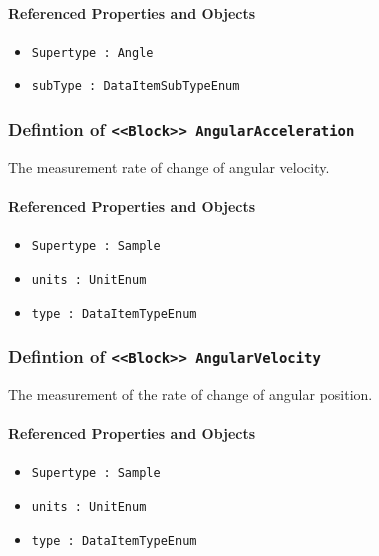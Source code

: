 \FloatBarrier
\paragraph{Referenced Properties and Objects}

\begin{itemize}
\item \texttt{Supertype : Angle}

\item \texttt{subType : DataItemSubTypeEnum}

\end{itemize}
\FloatBarrier
\subsubsection{Defintion of \texttt{<<Block>> AngularAcceleration}}
  \label{type:AngularAcceleration}

\FloatBarrier

The measurement rate of change of angular velocity.

\FloatBarrier
\paragraph{Referenced Properties and Objects}

\begin{itemize}
\item \texttt{Supertype : Sample}

\item \texttt{units : UnitEnum}

\item \texttt{type : DataItemTypeEnum}

\end{itemize}
\FloatBarrier
\subsubsection{Defintion of \texttt{<<Block>> AngularVelocity}}
  \label{type:AngularVelocity}

\FloatBarrier

The measurement of the rate of change of angular position.

\FloatBarrier
\paragraph{Referenced Properties and Objects}

\begin{itemize}
\item \texttt{Supertype : Sample}

\item \texttt{units : UnitEnum}

\item \texttt{type : DataItemTypeEnum}

\end{itemize}
\FloatBarrier
